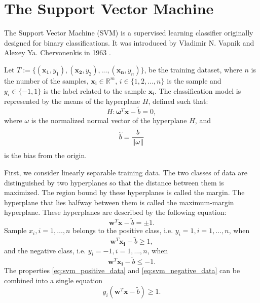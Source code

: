 \section{The Support Vector Machine}
The Support Vector Machine (SVM) is a supervised learning classifier originally designed for binary classifications. It was introduced by Vladimir N. Vapnik and Alexey Ya. Chervonenkis in 1963 \cite{Cortes1995}.

Let \( T := \{(\boldsymbol{x_1}, y_1),(\boldsymbol{x_2}, y_2),...,(\boldsymbol{x_n}, y_n)\} \),
be the training dataset, where $n$ is the number of the samples, \( \boldsymbol{x_i} \in \mathbb{R}^m \), \( i \in \{1,2,\dots,n\} \)
is the sample and \( y_i \in \{-1, 1\} \) is the label related to the sample \( \boldsymbol{x_i} \). The classification model is represented by the means of the hyperplane \( H \), defined such that:
\begin{equation}
    H: \boldsymbol{\omega}^T\boldsymbol{x}-\widetilde{b}=0,
    \label{eq:svm:hyperplane}
\end{equation}
where \( \omega \) is the normalized normal vector of the hyperplane \( H \), and
\begin{equation}
    \widetilde{b} = \frac{b}{\left\lVert\omega\right\rVert}
    \label{eq:svm:offset}
\end{equation}
is the bias from the origin.

First, we consider linearly separable training data. The two classes of data are distinguished by two hyperplanes so that the distance between them is maximized. The region bound by these hyperplanes is called the margin. The hyperplane that lies halfway between them is called the maximum-margin hyperplane. These hyperplanes are described by the following equation:
\begin{equation}
    \boldsymbol{w}^T\boldsymbol{x}-\widetilde{b}=\pm1.
    \label{eq:svm_hyperplanes}
\end{equation}
Sample $x_i, i=1,\dots,n$ belongs to the positive class, i.e. $y_i = 1, i=1,\dots,n$, when
\begin{equation}
    \boldsymbol{w}^T\boldsymbol{x_i}-\widetilde{b}\geq1,
    \label{eq:svm_positive_data}
\end{equation}
and the negative class, i.e. $y_i = -1, i=1,\dots,n$, when
\begin{equation}
    \boldsymbol{w}^T\boldsymbol{x_i}-\widetilde{b}\leq-1.
    \label{eq:svm_negative_data}
\end{equation}
The properties \eqref{eq:svm_positive_data} and \eqref{eq:svm_negative_data} can be combined into a single equation
\begin{equation}
    y_i(\boldsymbol{w}^T\boldsymbol{x}-\widetilde{b})\geq1.
\end{equation}

